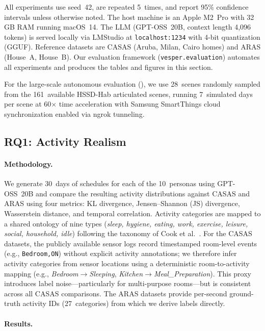 All experiments use seed~42, are repeated 5~times, and report
95\% confidence intervals unless otherwise noted.  The host machine
is an Apple M2~Pro with 32\,GB RAM running macOS~14.  The LLM
(GPT-OSS~20B, context length 4{,}096 tokens) is served locally via
LMStudio at \texttt{localhost:1234} with 4-bit quantization (GGUF).
Reference datasets are CASAS (Aruba, Milan, Cairo homes) and
ARAS (House~A, House~B).  Our evaluation framework
(\texttt{vesper.evaluation}) automates all experiments and
produces the tables and figures in this section.

For the large-scale autonomous evaluation (),
we use 28~scenes randomly sampled from the 161~available HSSD-Hab
articulated scenes, running 7~simulated days per scene at 60$\times$
time acceleration with Samsung SmartThings cloud synchronization
enabled via ngrok tunneling.

\subsection{RQ1: Activity Realism}\label{sec:eval-rq1}

\paragraph{Methodology.}
We generate 30~days of schedules for each of the 10~personas
using GPT-OSS~20B and compare the resulting activity
distributions against CASAS and ARAS using four metrics:
KL divergence, Jensen--Shannon (JS) divergence, Wasserstein
distance, and temporal correlation.  Activity categories are
mapped to a shared ontology of nine types (\emph{sleep, hygiene,
eating, work, exercise, leisure, social, household, idle}) following
the taxonomy of Cook et al.~\cite{casas}.
For the CASAS datasets, the publicly available sensor logs record
timestamped room-level events (e.g., \texttt{Bedroom,ON}) without
explicit activity annotations; we therefore infer activity categories
from sensor locations using a deterministic room-to-activity mapping
(e.g., \emph{Bedroom}$\to$\emph{Sleeping},
\emph{Kitchen}$\to$\emph{Meal\_Preparation}).
This proxy introduces label noise---particularly for multi-purpose
rooms---but is consistent across all CASAS comparisons.
The ARAS datasets provide per-second ground-truth activity IDs
(27~categories) from which we derive labels directly.

\paragraph{Results.}

